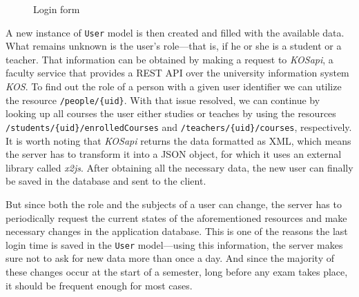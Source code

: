 \documentclass[thesis=M,english,hidelinks]{FITthesis}[2012/10/20]
\newcommand{\code}{\texttt}
\begin{document}
\begin{figure}
  \setlength\fboxsep{0pt}
  \setlength\fboxrule{0.2pt}
  \caption{Login form}
  \label{fig:login_form}
\end{figure}

A new instance of \code{User} model is then created and filled with the available data. What remains unknown is the user's role---that is, if he or she is a student or a teacher. That information can be obtained by making a request to \textit{KOSapi}, a faculty service that provides a REST API over the university information system \textit{KOS}. To find out the role of a person with a given user identifier we can utilize the resource \code{/people/\{uid\}}. With that issue resolved, we can continue by looking up all courses the user either studies or teaches by using the resources \code{/students/\{uid\}/enrolledCourses} and \code{/teachers/\{uid\}/courses}, respectively. It is worth noting that \textit{KOSapi} returns the data formatted as XML, which means the server has to transform it into a JSON object, for which it uses an external library called \textit{x2js}. After obtaining all the necessary data, the new user can finally be saved in the database and sent to the client.

But since both the role and the subjects of a user can change, the server has to periodically request the current states of the aforementioned resources and make necessary changes in the application database. This is one of the reasons the last login time is saved in the \code{User} model---using this information, the server makes sure not to ask for new data more than once a day. And since the majority of these changes occur at the start of a semester, long before any exam takes place, it should be frequent enough for most cases.
\end{document}
